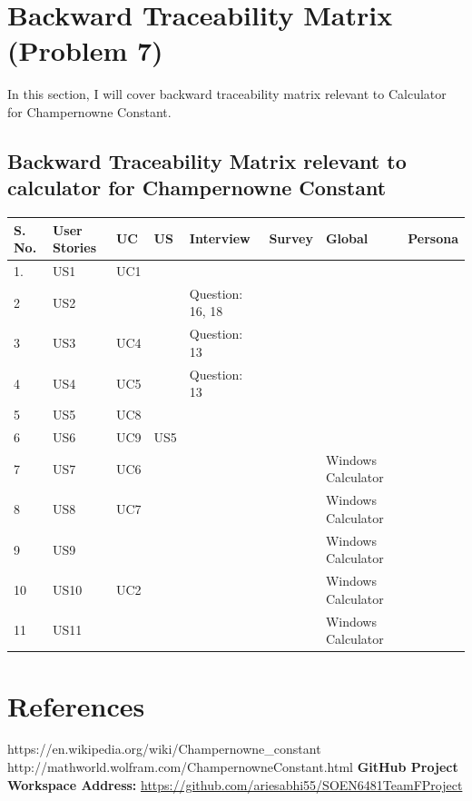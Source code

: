 \documentclass[paper=a4, fontsize=11pt]{report}
\numberwithin{equation}{section}		%
\numberwithin{figure}{section}			%
\numberwithin{table}{section}				%
\begin{document}

\chapter{Backward Traceability Matrix (Problem 7)}
In this section, I will cover backward traceability matrix relevant to Calculator for Champernowne Constant. \newline

  
\section{Backward Traceability Matrix relevant to calculator for Champernowne Constant }

\begin{center}
\begin{tabular}{| m{.8cm} | m{1.8cm} | m{.8cm} | m{.8cm}| m{3cm} | m{1cm} | m{3cm} | m{1.5cm} |} 
\hline
S. No. & User Stories & UC & US & Interview & Survey & Global & Persona \\ [0.7ex]
\hline\hline
1. & US1 & UC1 &  &  &  &  & \\ 
\hline
2 & US2 &  &  & Question: 16, 18 &  &  &   \\ 
\hline
3 & US3 & UC4 &  & Question: 13 &  &  &  \\ 
\hline
4 & US4 & UC5 &  & Question: 13 &  &  &  \\ 
\hline
5 & US5 & UC8 &  &  &  &  &  \\ 
\hline
6 & US6 & UC9 & US5 &  &  &  &  \\ 
\hline
7 & US7 & UC6 &  &  &  & Windows Calculator &  \\ 
\hline
8 & US8 & UC7 &  &  &  & Windows Calculator & \\ 
\hline
9 & US9 &  &  &  &  & Windows Calculator &  \\ 
\hline
10 & US10 & UC2 &  &  &  & Windows Calculator &  \\ 
\hline
11 & US11 &  &  &  &  & Windows Calculator &  \\ 
\hline
\end{tabular}
\end{center}



\printglossary

\chapter{References}

https://en.wikipedia.org/wiki/Champernowne\_constant
\vskip1mm
http://mathworld.wolfram.com/ChampernowneConstant.html
\vskip1mm
\textbf{GitHub Project Workspace Address:} \url{https://github.com/ariesabhi55/SOEN6481TeamFProject} 
\end{document}
